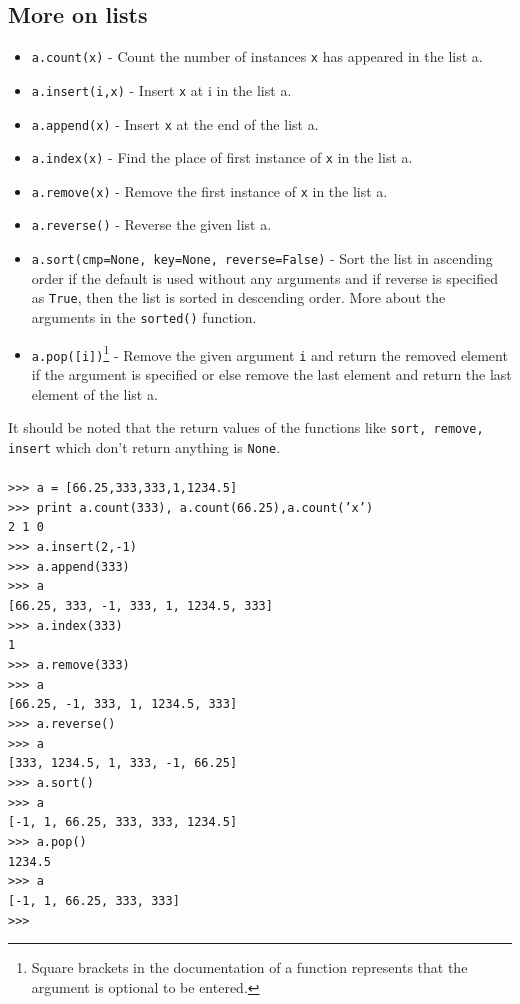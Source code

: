\documentclass[12pt,a4paper]{article}
\begin{document}
\subsection{More on lists}
\begin{itemize}
\item \texttt{a.count(x)} - Count the number of instances \texttt{x} has appeared in the list a.
\item \texttt{a.insert(i,x)} - Insert \texttt{x} at i in the list a.
\item \texttt{a.append(x)} - Insert \texttt{x} at the end of the list a.
\item \texttt{a.index(x)} - Find the place of first instance of \texttt{x} in the list a.
\item \texttt{a.remove(x)} - Remove the first instance of \texttt{x} in the list a.
\item \texttt{a.reverse()} - Reverse the given list a.
\item \texttt{a.sort(cmp=None, key=None, reverse=False)} - Sort the list in ascending order if the default is used without any arguments and if reverse is specified as \texttt{True}, then the list is sorted in descending order. More about the arguments in the \texttt{sorted()} function.
\item \texttt{a.pop([i])}\footnote{Square brackets in the documentation of a function represents that the argument is optional to be entered.} - Remove the given argument \texttt{i} and return the removed element if the argument is specified or else remove the last element and return the last element of the list a. 
\end{itemize}
It should be noted that the return values of the functions like \texttt{sort, remove, insert} which don't return anything is \texttt{None}. \\
\texttt{
\\
>>> a = [66.25,333,333,1,1234.5]\\
>>> print a.count(333), a.count(66.25),a.count('x')\\
2 1 0\\
>>> a.insert(2,-1)\\
>>> a.append(333)\\
>>> a\\
{[66.25, 333, -1, 333, 1, 1234.5, 333]}\\
>>> a.index(333)\\
1\\
>>> a.remove(333)\\
>>> a\\
{[66.25, -1, 333, 1, 1234.5, 333]}\\
>>> a.reverse()\\
>>> a\\
{[333, 1234.5, 1, 333, -1, 66.25]}\\
>>> a.sort()\\
>>> a\\
{[-1, 1, 66.25, 333, 333, 1234.5]}\\
>>> a.pop()\\
1234.5\\
>>> a\\
{[-1, 1, 66.25, 333, 333]}\\
>>>\\ }
\end{document}
